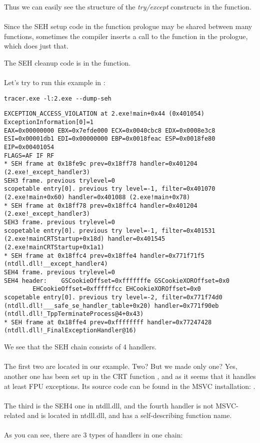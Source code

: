 Thus we can easily see the structure of the \emph{try/except} constructs in the function.\\
\\
Since the SEH setup code in the function prologue may be shared between many functions,
sometimes the compiler inserts a call to the  function in the prologue, which does just that.

The SEH cleanup code is in the  function.\\
\\
Let's try to run this example in \tracer{}:

\begin{lstlisting}
tracer.exe -l:2.exe --dump-seh
\end{lstlisting}

\begin{lstlisting}[caption=tracer.exe output]
EXCEPTION_ACCESS_VIOLATION at 2.exe!main+0x44 (0x401054) ExceptionInformation[0]=1
EAX=0x00000000 EBX=0x7efde000 ECX=0x0040cbc8 EDX=0x0008e3c8
ESI=0x00001db1 EDI=0x00000000 EBP=0x0018feac ESP=0x0018fe80
EIP=0x00401054
FLAGS=AF IF RF
* SEH frame at 0x18fe9c prev=0x18ff78 handler=0x401204 (2.exe!_except_handler3)
SEH3 frame. previous trylevel=0
scopetable entry[0]. previous try level=-1, filter=0x401070 (2.exe!main+0x60) handler=0x401088 (2.exe!main+0x78)
* SEH frame at 0x18ff78 prev=0x18ffc4 handler=0x401204 (2.exe!_except_handler3)
SEH3 frame. previous trylevel=0
scopetable entry[0]. previous try level=-1, filter=0x401531 (2.exe!mainCRTStartup+0x18d) handler=0x401545 (2.exe!mainCRTStartup+0x1a1)
* SEH frame at 0x18ffc4 prev=0x18ffe4 handler=0x771f71f5 (ntdll.dll!__except_handler4)
SEH4 frame. previous trylevel=0
SEH4 header:	GSCookieOffset=0xfffffffe GSCookieXOROffset=0x0
		EHCookieOffset=0xffffffcc EHCookieXOROffset=0x0
scopetable entry[0]. previous try level=-2, filter=0x771f74d0 (ntdll.dll!___safe_se_handler_table+0x20) handler=0x771f90eb (ntdll.dll!_TppTerminateProcess@4+0x43)
* SEH frame at 0x18ffe4 prev=0xffffffff handler=0x77247428 (ntdll.dll!_FinalExceptionHandler@16)
\end{lstlisting}

We see that the SEH chain consists of 4 handlers.\\
\\
The first two are located in our example. Two?
But we made only one?
Yes, another one has been set up in the \ac{CRT} function , and as it seems that it handles at least \ac{FPU} exceptions.
Its source code can be found in the MSVC installation: .\\
\\
The third is the SEH4 one in ntdll.dll, 
and the fourth handler is not MSVC-related and is located in ntdll.dll, and has a self-describing function name.\\
\\
As you can see, there are 3 types of handlers in one chain:

